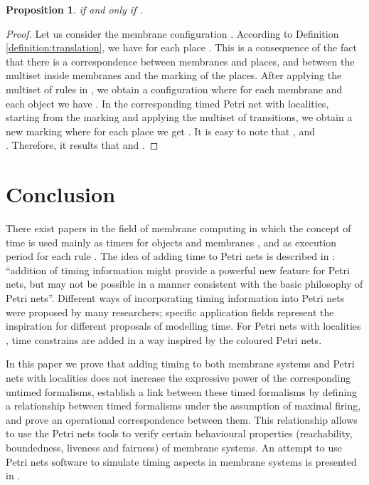 \documentclass{eptcs}
\newtheorem{proposition}{Proposition}
\begin{document}
\begin{proposition}\label{proposition:corresp}
 if and only if .
\end{proposition}
\begin{proof}[Proof] Let us consider the membrane
configuration  . According to Definition
\ref{definition:translation}, we have  for each place
. This is a consequence of the fact that there is a
correspondence between membranes and places, and between the
multiset inside membranes and the marking of the places.
After applying the multiset  of rules in
, we obtain a configuration  where for each
membrane  and each object  we have
. In
the corresponding timed Petri net with localities, starting from the
marking  and applying the multiset  of transitions, we
obtain a new marking  where for each place  we get
. It
is easy to note that ,  and\\
. Therefore, it results that  and
.
\end{proof}

\section{Conclusion}
\label{section:conclusion}

There exist papers in the field of membrane computing in which the
concept of time is used mainly as timers for objects and
membranes \cite{CompMod09,IJCCC10}, and as execution period for
each rule \cite{Cavaliere05,Cavaliere10}.
The idea of adding time to Petri nets is described in
\cite{Peterson81}: ``addition of timing information might
provide a powerful new feature for Petri nets, but may not be
possible in a manner consistent with the basic philosophy of Petri
nets''. Different ways of incorporating timing information into
Petri nets were proposed by many researchers; specific application
fields represent the inspiration for different proposals of
modelling time. For Petri nets with localities \cite{Kleijn06},
time constrains are added in a way inspired by the coloured Petri nets.

In this paper we prove that adding timing to both membrane
systems and Petri nets with localities does not increase the
expressive power of the corresponding untimed formalisms,
establish a link between these timed formalisms by defining
a relationship between timed formalisms under the assumption of
maximal firing, and prove an operational correspondence between
them. This relationship allows to use the Petri nets
tools to verify certain behavioural properties (reachability,
boundedness, liveness and fairness) of membrane systems.
An attempt to use Petri nets software to simulate timing aspects in membrane
systems is presented in \cite{Profir05}.
\end{document}
